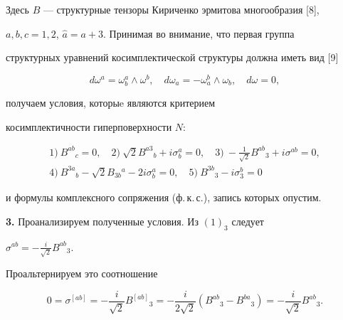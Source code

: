 Здесь $B$ --- структурные тензоры Кириченко эрмитова многообразия [8],


$a,b,c = 1,2$, $\widehat {a}=a+3$. Принимая во внимание, что первая группа 


структурных уравнений косимплектической структуры должна иметь вид [9]


$$


d \omega^a = \omega^a_b \wedge \omega^b,\quad


d \omega _a=- \omega^b_a \wedge \omega _b,\quad 


d \omega=0,


$$


получаем условия, которыe являются критерием


косимплектичности гиперповерхности $N$:


\begin{equation}


\begin{array}{c}


1) \ B^{ab} {_c}=0, \quad


2) \ \sqrt{2} B^{a3}{_b} + i \sigma^a_b=0, \quad 


3) \ -\frac {1}{\sqrt{2}} B^{ab}{_3}


+ i \sigma^{ab}=0, \\[2mm]


4) \ B^{3a}{_b} - \sqrt {2} B_{3b} {^a} - 2 i \sigma _b^a=0, \quad 


5) \ B^{3b} {_3} - i \sigma _3^b =0


\end{array}


\end{equation}


и формулы комплексного сопряжения (ф.\,к.\,с.), запись которых опустим.


\medskip





{\bf 3.} Проанализируем полученные условия. Из $(1)_3$ следует


$\sigma ^{ab} = -\frac {i}{\sqrt {2}} B^{ab} {_3}$.


Проальтернируем это соотношение


$$


0=\sigma^{[ab]}=- \frac {i}{ \sqrt 2} B^{[ab]} {_3}=


-\frac {i}{2 \sqrt {2}}(B^{ab}{_3} - B^{ba}{_3}) = 


- \frac {i}{\sqrt {2}} B^{ab} {_3}.


$$


